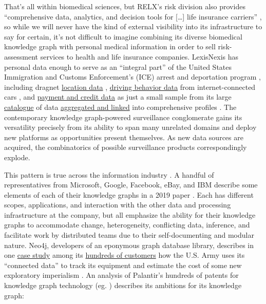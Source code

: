 That's all within biomedical sciences, but RELX's risk division also
provides ``comprehensive data, analytics, and decision tools for
{[}\ldots{]} life insurance carriers'' \cite{relxAnnualReport20222023} , so while we will never have the kind of
external visibility into its infrastructure to say for certain, it's not
difficult to imagine combining its diverse biomedical knowledge graph
with personal medical information in order to sell risk-assessment
services to health and life insurance companies. LexisNexis has personal
data enough to serve as an ``integral part'' of the United States
Immigration and Customs Enforcement's (ICE) arrest and deportation
program \cite{biddleLexisNexisProvideGiant2021, biddleICESearchedLexisNexis2022} , including dragnet
\href{https://web.archive.org/web/20230308034123/https://risk.lexisnexis.com/products/accurint-trax}{location
data} \cite{lexisnexisrisksolutionsAccurintTraX} ,
\href{https://risk.lexisnexis.com/products/telematics-ondemand}{driving
behavior data} from internet-connected cars \cite{lexisnexisrisksolutionsTelematicsOnDemand} , and
\href{https://risk.lexisnexis.com/products/threatmetrix}{payment and
credit data} as just a small sample from its large
\href{https://web.archive.org/web/20230308034302/https://www.lexisnexis.com/pdf/AccurintForLegalProfessionals/24.pdf}{catalogue}
\cite{lexisnexisrisksolutionsAccurintLegalProfessionals2022}  of
data \href{https://risk.lexisnexis.com/our-technology/lexid}{aggregated
and linked} into comprehensive profiles \cite{lexisnexisrisksolutionsLexID} . The contemporary knowledge
graph-powered surveillance conglomerate gains its versatility precisely
from its ability to span many unrelated domains and deploy new platforms
as opportunities present themselves. As new data sources are acquired,
the combinatorics of possible surveillance products correspondingly
explode.

This pattern is true across the information industry \cite{sequedaDesigningBuildingEnterprise2021} . A handful of
representatives from Microsoft, Google, Facebook, eBay, and IBM describe
some elements of each of their knowledge graphs in a 2019 paper \cite{noyIndustryscaleKnowledgeGraphs2019} . Each has different
scopes, applications, and interaction with the other data and processing
infrastructure at the company, but all emphasize the ability for their
knowledge graphs to accommodate change, heterogeneity, conflicting data,
inference, and facilitate work by distributed teams due to their
self-documenting and modular nature. Neo4j, developers of an eponymous
graph database library, describes in one
\href{https://neo4j.com/case-studies/us-army/}{case study} among its
\href{https://neo4j.com/customers/}{hundreds of customers} how the U.S.
Army uses its ``connected data'' to track its equipment and estimate the
cost of some new exploratory imperialism \cite{neo4jNeo4jArmyCase2021} . An analysis of Palantir's hundreds of
patents for knowledge graph technology (eg. \cite{cohenSystemMethodSharing2015, mathuraAutomatedDatabaseAnalysis2017, yousafSystemsMethodsUser2018, knudsonSystemsMethodsAnnotating2021} )
describes its ambitions for its knowledge graph:

